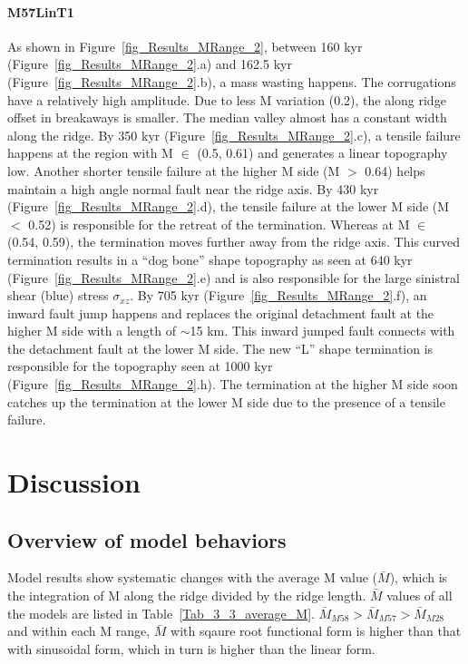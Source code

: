 \documentclass[draft,gc]{agutex}
\begin{document}
\begin{article}
\paragraph{M57LinT1}\label{para_M57LinT1}
As shown in Figure~\ref{fig_Results_MRange_2}, between 160 kyr (Figure~\ref{fig_Results_MRange_2}.a) and 162.5 kyr (Figure~\ref{fig_Results_MRange_2}.b), a mass wasting happens. The corrugations have a relatively high amplitude. Due to less M variation (0.2), the along ridge offset in breakaways is smaller. The median valley almost has a constant width along the ridge. By 350 kyr (Figure~\ref{fig_Results_MRange_2}.c), a tensile failure happens at the region with M $\in$ (0.5, 0.61) and generates a linear topography low. Another shorter tensile failure at the higher M side (M $>$ 0.64) helps maintain a high angle normal fault near the ridge axis. By 430 kyr (Figure~\ref{fig_Results_MRange_2}.d), the tensile failure at the lower M side (M $<$ 0.52) is responsible for the retreat of the termination. Whereas at M $\in$ (0.54, 0.59), the termination moves further away from the ridge axis. This curved termination results in a ``dog bone'' shape topography as seen at 640 kyr (Figure~\ref{fig_Results_MRange_2}.e) and is also responsible for the large sinistral shear (blue) stress $\sigma_{xz}$. By 705 kyr (Figure~\ref{fig_Results_MRange_2}.f), an inward fault jump happens and replaces the original detachment fault at the higher M side with a length of $\sim$15 km. This inward jumped fault connects with the detachment fault at the lower M side. The new ``L'' shape termination is responsible for the topography seen at 1000 kyr (Figure~\ref{fig_Results_MRange_2}.h). The termination at the higher M side soon catches up the termination at the lower M side due to the presence of a tensile failure.

\section{Discussion}
\subsection{Overview of model behaviors}
Model results show systematic changes with the average M value ($\bar{M}$), which is the integration of M along the ridge divided by the ridge length. $\bar{M}$ values of all the models are listed in Table~\ref{Tab_3_3_average_M}. $\bar{M}_{M58} > \bar{M}_{M57} > \bar{M}_{M28}$ and within each M range, $\bar{M}$ with sqaure root functional form is higher than that with sinusoidal form, which in turn is higher than the linear form.


\end{article}
\end{document}
